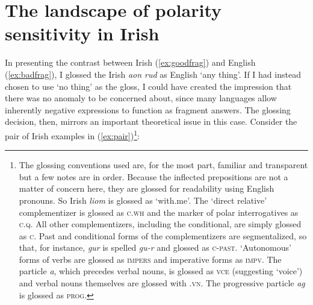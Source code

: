 \documentclass[output=paper,colorlinks,citecolor=brown]{langscibook}
\begin{document}
\section{The landscape of polarity sensitivity in Irish}
\label{sec:npi}

In presenting the contrast between Irish (\ref{ex:goodfrag}) and English (\ref{ex:badfrag}), I glossed the Irish{ \itshape aon rud} as English `any thing'. If I had instead chosen to use `no thing' as the gloss, I could have created the impression that there was no anomaly to be concerned about, since many languages allow inherently negative expressions to function as fragment answers. The glossing decision, then, mirrors an important theoretical issue in this case. Consider the pair of Irish examples in (\ref{ex:pair})\footnote{The glossing conventions used are, for the most part, familiar and transparent but a few notes are in order. Because the inflected prepositions are not a matter of concern here, they are glossed for readability using English pronouns. So Irish \textit{liom} is glossed as `with.me'. The `direct relative' complementizer is glossed as {\scshape c.wh} and the marker of polar interrogatives as \textsc{c.q}. All other complementizers, including the conditional, are simply glossed as {\scshape c}. Past and conditional forms of the complementizers are segmentalized, so that, for instance, \textit{gur} is spelled \textit{gu-r} and glossed as {\scshape c-past}.  `Autonomous' forms of verbs are glossed as \textsc{impers} and imperative forms as \textsc{impv}. The particle \textit{a}, which precedes verbal nouns, is glossed as \textsc{vce} (suggesting `voice') and verbal nouns themselves are glossed with \textsc{.vn}. The progressive particle \textit{ag} is glossed as \textsc{prog}.}:

\ea\label{ex:pair}
\z
\z

\end{document}
